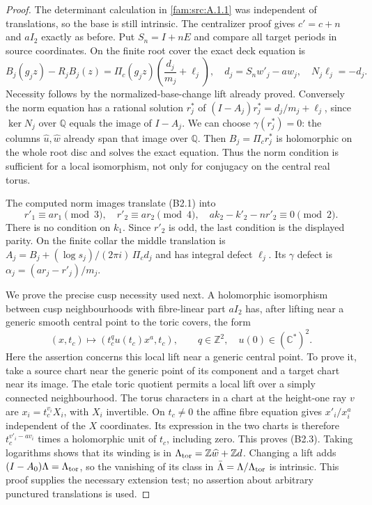 \begin{proof}
The determinant calculation in \ref{fam:src:A.1.1} was independent of translations, so the base is still intrinsic. The centralizer proof gives $c'=c+n$ and $aI_2$ exactly as before. Put $S_n=I+nE$ and compare all target periods in source coordinates. On the finite root cover the exact deck equation is
\[
 B_j(g_jz)-R_jB_j(z)=\Pi_c(g_jz)\left(\frac{d_j}{m_j}+\ell_j\right),
 \quad d_j=S_nw'_j-a w_j,
 \quad N_j\ell_j=-d_j.                                      \tag{B2.1}
\]
Necessity follows by the normalized-base-change lift already proved. Conversely the norm equation has a rational solution $r_j^*$ of
$(I-A_j)r_j^*=d_j/m_j+\ell_j$, since $\ker N_j$ over $\mathbb Q$ equals the image of $I-A_j$. We can choose $\gamma(r_j^*)=0$: the columns $\widehat u,\widehat w$ already span that image over $\mathbb Q$. Then $B_j=\Pi_cr_j^*$ is holomorphic on the whole root disc and solves the exact equation. Thus the norm condition is sufficient for a local isomorphism, not only for conjugacy on the central real torus.

The computed norm images translate (B2.1) into
\[
 r'_1\equiv ar_1\pmod3,\quad r'_2\equiv ar_2\pmod4,
 \quad ak_2-k'_2-nr'_2\equiv0\pmod2.                       \tag{B2.2}
\]
There is no condition on $k_1$. Since $r'_2$ is odd, the last condition is the displayed parity. On the finite collar the middle translation is
$A_j=B_j+(\log s_j)/(2\pi i)\,\Pi_cd_j$ and has integral defect $\ell_j$. Its $\gamma$ defect is
$\alpha_j=(ar_j-r'_j)/m_j$.

We prove the precise cusp necessity used next. A holomorphic isomorphism between cusp neighbourhoods with fibre-linear part $aI_2$ has, after lifting near a generic smooth central point to the toric covers, the form
\[
 (x,t_c)\longmapsto(t_c^q u(t_c)x^a,t_c),\qquad q\in\mathbb Z^2,
 \quad u(0)\in(\mathbb C^*)^2.                           \tag{B2.3}
\]
Here the assertion concerns this local lift near a generic central point. To prove it, take a source chart near the generic point of its component and a target chart near its image. The etale toric quotient permits a local lift over a simply connected neighbourhood. The torus characters in a chart at the height-one ray $v$ are $x_i=t_c^{v_i}X_i$, with $X_i$ invertible. On $t_c\ne0$ the affine fibre equation gives $x'_i/x_i^a$ independent of the $X$ coordinates. Its expression in the two charts is therefore $t_c^{v'_i-av_i}$ times a holomorphic unit of $t_c$, including zero. This proves (B2.3). Taking logarithms shows that its winding is in $\Lambda_{\rm tor}=\mathbb Z\widehat w+\mathbb Zd$. Changing a lift adds $(I-A_0)\Lambda=\Lambda_{\rm tor}$, so the vanishing of its class in $\bar\Lambda=\Lambda/\Lambda_{\rm tor}$ is intrinsic. This proof supplies the necessary extension test; no assertion about arbitrary punctured translations is used.


\end{proof}
